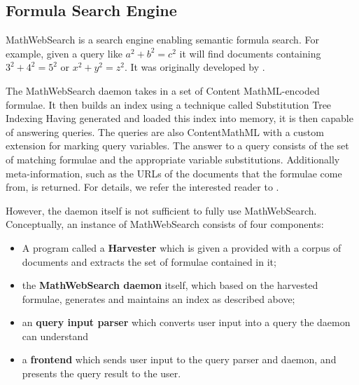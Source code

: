 
\subsection{Formula Search Engine}


MathWebSearch  is a search engine enabling semantic formula search. 
For example, given a query like $a^2 + b^2 = c^2$ it will find documents containing $3^2 + 4^2 = 5^2$ or $x^2 + y^2 = z^2$.
It was originally developed by . 

The MathWebSearch daemon takes in a set of Content MathML-encoded formulae.
It then builds an index using a technique called Substitution Tree Indexing
Having generated and loaded this index into memory, it is then capable of answering queries.
The queries are also ContentMathML with a custom extension for marking query variables.
The answer to a query consists of the set of matching formulae and the appropriate variable substitutions. 
Additionally meta-information, such as the URLs of the documents that the formulae come from, is returned. 
For details, we refer the interested reader to .  

However, the daemon itself is not sufficient to fully use MathWebSearch. 
Conceptually, an instance of MathWebSearch consists of four components:
\begin{itemize}
    \item A program called a \textbf{Harvester} which is given a provided with a corpus of documents and extracts the set of formulae contained in it;
    \item the \textbf{MathWebSearch daemon} itself, which based on the harvested formulae, generates and maintains an index as described above;
    \item an \textbf{query input parser} which converts user input into a query the daemon can understand
    \item a \textbf{frontend} which sends user input to the query parser and daemon, and presents the query result to the user.  
\end{itemize}

